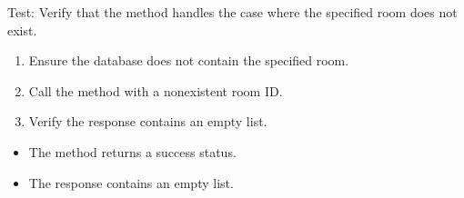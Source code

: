 \documentclass[letterpaper,10pt,english]{sphinxmanual}
\begin{document}
\begin{fulllineitems}
\label{\detokenize{test:test.test_residetnt.test_list_residents_in_room_room_not_found}}
\pysigstartsignatures
\pysiglinewithargsret
{}
{}
{}
\pysigstopsignatures
\sphinxAtStartPar
Test: Verify that the method handles the case where the specified room does not exist.
\begin{description}
\begin{enumerate}
%
\item {} 
\sphinxAtStartPar
Ensure the database does not contain the specified room.

\item {} 
\sphinxAtStartPar
Call the  method with a non\sphinxhyphen{}existent room ID.

\item {} 
\sphinxAtStartPar
Verify the response contains an empty list.

\end{enumerate}

\begin{itemize}
\item {} 
\sphinxAtStartPar
The method returns a success status.

\item {} 
\sphinxAtStartPar
The response contains an empty list.

\end{itemize}

\end{description}

\end{fulllineitems}

\end{document}
